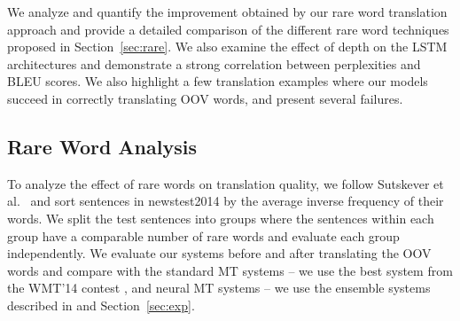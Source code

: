 
We analyze and quantify the improvement obtained by our rare word translation approach and provide a detailed 
comparison of the different rare word techniques proposed in Section~\ref{sec:rare}. We also examine the effect of 
depth on the LSTM architectures and demonstrate a strong correlation between perplexities and BLEU scores. We also highlight 
a few translation examples where our models succeed in correctly translating OOV words, and present 
several failures.

\subsection{Rare Word Analysis}
To analyze the effect of rare words on translation quality, 
we follow Sutskever et al.~\cite{sutskever14} and sort sentences in 
newstest2014 by the average inverse frequency of their words. 
We split the test sentences into groups where the sentences within each group have a comparable number of rare words
 and evaluate each group independently. We evaluate our 
systems before and after translating the OOV words and compare with 
the standard MT systems -- we use the best system from the WMT'14 contest \cite{durrani-EtAl:2014:W14-33},
and neural MT systems -- we use the ensemble systems described in \cite{sutskever14} and Section~\ref{sec:exp}.

